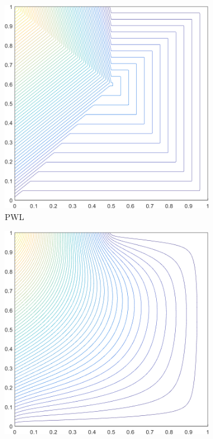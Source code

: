 \begin{figure}
{\begin{subfigure}[b]{0.39\textwidth}
		\includegraphics[width=\textwidth]{figures/sec_BF/deg_square_PWLD1_contour_b5.png}
		\caption{PWL}
	\end{subfigure}
}
	\vspace{3mm}
{
	\begin{subfigure}[b]{0.39\textwidth}
		\centering
		\includegraphics[width=\textwidth]{figures/sec_BF/deg_square_MV1_contour_b5.png}

\end{subfigure}}
\end{figure}
